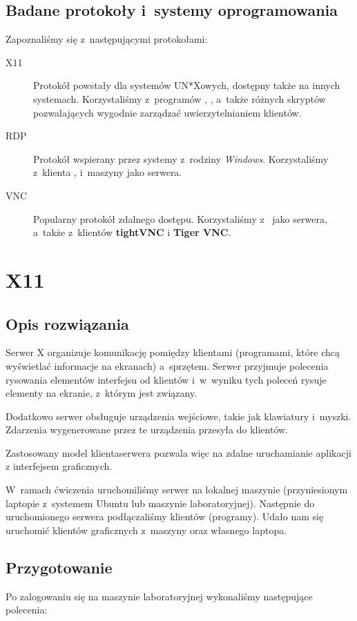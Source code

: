 \documentclass[a4paper,11pt]{article}
\begin{document}
\subsection{Badane protokoły i~systemy oprogramowania}
Zapoznaliśmy się z~następującymi protokołami:
\begin{description}
  \item[X11] Protokół powstały dla systemów UN*X\dywiz owych, dostępny także na
    innych systemach. Korzystaliśmy z~programów \ssh, \xbin, a~także różnych
    skryptów pozwalających wygodnie zarządzać uwierzytelnianiem klientów.
  \item[RDP] Protokół wspierany przez systemy z~rodziny \emph{Windows}.
    Korzystaliśmy z~klienta \rdp, i~maszyny \wat{} jako serwera.
  \item[VNC] Popularny protokół zdalnego dostępu. Korzystaliśmy z~\xvnc{} jako
    serwera, a~także z~klientów \textbf{tightVNC} i \textbf{Tiger VNC}.
\end{description}


\section{X11}

\subsection{Opis rozwiązania}
Serwer X organizuje komunikację pomiędzy klientami (programami, które chcą
wyświetlać informacje na ekranach) a~sprzętem. Serwer przyjmuje polecenia
rysowania elementów interfejsu od klientów i~w~wyniku tych poleceń rysuje
elementy na ekranie, z~którym jest związany.

Dodatkowo serwer obsługuje urządzenia wejściowe, takie jak klawiatury i~myszki.
Zdarzenia wygenerowane przez te urządzenia przesyła do klientów.

Zastosowany model klienta\dywiz serwera pozwala więc na zdalne uruchamianie
aplikacji z interfejsem graficznych.

W~ramach ćwiczenia uruchomiliśmy serwer \xbin{} na lokalnej maszynie
(przyniesionym laptopie z~systemem Ubuntu lub maszynie laboratoryjnej).
Następnie do uruchomionego serwera podłączaliśmy klientów (programy). Udało nam
się uruchomić klientów graficznych z~maszyny \volt{} oraz własnego laptopa.

\subsection{Przygotowanie}
Po zalogowaniu się na maszynie laboratoryjnej wykonaliśmy następujące polecenia:
\end{document}
